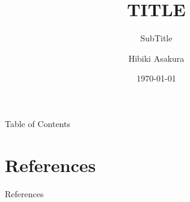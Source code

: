 \documentclass[unicode,9pt]{beamer}%
\title[short title]{TITLE}
\subtitle{SubTitle}
\author[H.Asakura]{Hibiki Asakura}
\institute[Kyoto U.]{Kyoto University}
\date{\today}
\begin{document}
\begin{frame}[noframenumbering]
  \titlepage
\end{frame}

\begin{frame}{Table of Contents}
  \tableofcontents[hideallsubsections]
\end{frame}




\section*{References}

\begin{frame}{References}
  
\end{frame}

\beginbackup

\backupend
\end{document}
